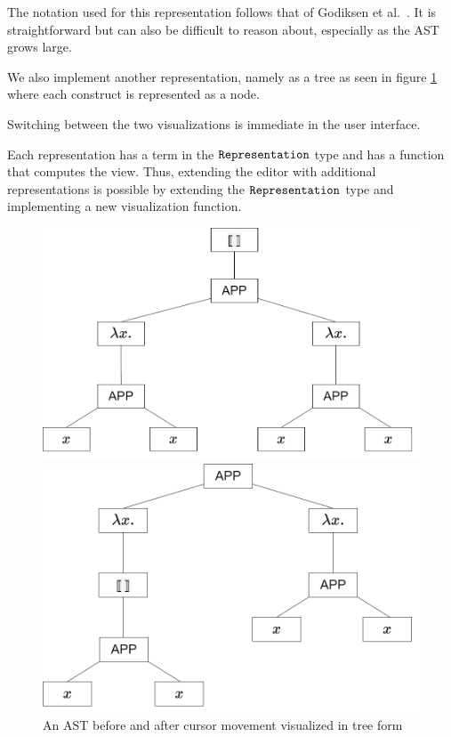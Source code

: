 The notation used for this representation follows that of Godiksen
et al.~\pepm. It is straightforward but can also be
difficult to reason about, especially as the AST grows large.

We also implement another representation, namely as a tree as seen in
figure \ref{fig:ast_visual_tree} where each construct is represented as a node.

Switching between the two visualizations is immediate in the user interface.

Each representation has a term in the $\texttt{Representation}$ type and has a
function that computes the view. Thus, extending the editor with additional
representations is possible by extending the $\texttt{Representation}$ type and
implementing a new visualization function.

\begin{figure}
  \center
  \noindent\begin{minipage}{.45\textwidth}
    \center
    \includegraphics[width=\textwidth]{assets/ast_root_cursor.png}
  \end{minipage}\hfill
  \begin{minipage}{.45\textwidth}
    \center
    \includegraphics[width=\textwidth]{assets/ast_subtree_cursor.png}
  \end{minipage}\hfill
  \caption{An AST before and after cursor movement visualized in tree form}
  \label{fig:ast_visual_tree}
\end{figure}

